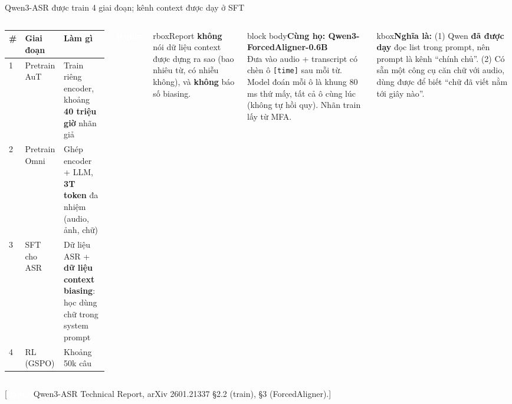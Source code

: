 \documentclass[aspectratio=169,xcolor=table]{beamer}
\newcommand{\src}[1]{\par\vfill{\tiny\color{TextGray}[#1]}}
\newcommand{\bsz}{\footnotesize}%
\newcommand{\nbox}[2][block body]{\begin{beamercolorbox}[sep=0.45em,rounded=true]{#1}\bsz #2\end{beamercolorbox}}
\newcommand{\nghiala}[1]{\begin{beamercolorbox}[sep=0.32em,rounded=true]{kbox}\bsz\textbf{Nghĩa là:} #1\end{beamercolorbox}}
\newcommand{\yeu}[1]{\begin{beamercolorbox}[sep=0.40em,rounded=true]{rbox}\bsz #1\end{beamercolorbox}}
\newcommand{\tagbox}[2]{{\scriptsize\colorbox{#1}{\textcolor{white}{\textbf{#2}}}}}
\newcommand{\PA}{\tagbox{Primary}{paper}}
\begin{document}
\begin{frame}{Qwen3-ASR được train 4 giai đoạn; kênh context được dạy ở SFT}
\begin{columns}[T]
\renewcommand{\arraystretch}{1.1}\footnotesize
\begin{tabular}{C{0.4cm}L{2.3cm}L{4.3cm}}
\toprule
\# & Giai đoạn & Làm gì \\
 & Pretrain AuT & Train riêng encoder, khoảng \textbf{40 triệu giờ} nhãn giả \\
2 & Pretrain Omni & Ghép encoder + LLM, \textbf{3T token} đa nhiệm (audio, ảnh, chữ) \\
 3 & SFT cho ASR & Dữ liệu ASR + \textbf{dữ liệu context biasing}: học dùng chữ trong system prompt \\
4 & RL (GSPO) & Khoảng 50k câu \\
\bottomrule
\end{tabular}
\PA
\vspace{0.15cm}

\yeu{Report \textbf{không} nói dữ liệu context được dựng ra sao (bao nhiêu từ, có nhiễu không), và \textbf{không} báo số biasing.}
\nbox{\textbf{Cùng họ: Qwen3-ForcedAligner-0.6B}\\[2pt]
Đưa vào audio + transcript có chèn ô \texttt{[time]} sau mỗi từ. Model đoán mỗi ô là khung 80 ms thứ mấy, tất cả ô cùng lúc (không tự hồi quy). Nhãn train lấy từ MFA.}
\vspace{0.12cm}
\nghiala{(1) Qwen \textbf{đã được dạy} đọc list trong prompt, nên prompt là kênh ``chính chủ''. (2) Có sẵn một công cụ căn chữ với audio, dùng được để biết ``chữ đã viết nằm tới giây nào''.}
\end{columns}
\src{\PA{} Qwen3-ASR Technical Report, arXiv 2601.21337 §2.2 (train), §3 (ForcedAligner).}
\end{frame}
\end{document}
